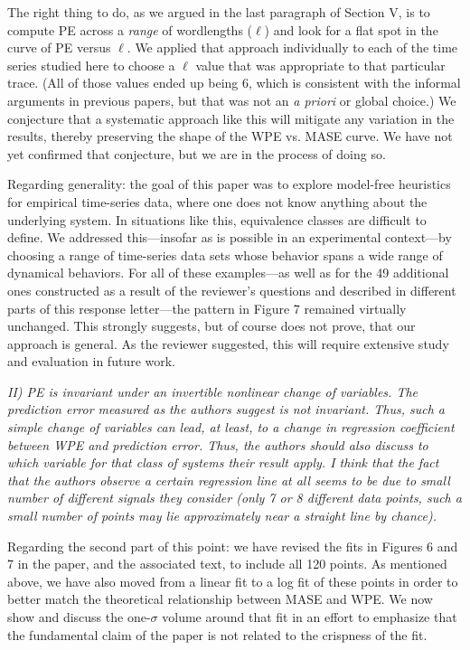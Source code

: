 \documentclass[12pt]{article}
\begin{document}
The right thing to do, as we argued in the last paragraph of Section
V, is to compute PE across a \emph{range} of wordlengths ($\ell$) and
look for a flat spot in the curve of PE versus $\ell$.  We applied
that approach individually to each of the time series studied here to
choose a $\ell$ value that was appropriate to that particular trace.
(All of those values ended up being 6, which is consistent with the
informal arguments in previous papers, but that was not an \emph{a
  priori} or global choice.)  We conjecture that a systematic approach
like this will mitigate any variation in the results, thereby
preserving the shape of the WPE vs. MASE curve.  We have not yet
confirmed that conjecture, but we are in the process of doing so.

Regarding generality: the goal of this paper was to explore model-free
heuristics for empirical time-series data, where one does not know
anything about the underlying system.  In situations like this,
equivalence classes are difficult to define.  We addressed
this---insofar as is possible in an experimental context---by choosing
a range of time-series data sets whose behavior spans a wide range of
dynamical behaviors.  For all of these examples---as well as for the
49 additional ones
constructed as a result of the reviewer's questions and described in
different parts of this response letter---the pattern in Figure 7
remained virtually unchanged.  This strongly suggests, but of course
does not prove, that our approach is general.  As the reviewer
suggested, this will require extensive study and evaluation in future
work.

\smallskip

\emph{II) PE is invariant under an invertible nonlinear change of
  variables. The prediction error measured as the authors suggest is
  not invariant. Thus, such a simple change of variables can lead, at
  least, to a change in regression coefficient between WPE and
  prediction error. Thus, the authors should also discuss to which
  variable for that class of systems their result apply. I think that
  the fact that the authors observe a certain regression line at all
  seems to be due to small number of different signals they consider
  (only 7 or 8 different data points, such a small number of points
  may lie approximately near a straight line by chance).}

Regarding the second part of this point: we have revised the fits in
Figures 6 and 7 in the paper, and the associated text, to include all
120 points.  As mentioned above, we have also moved from a linear fit
to a log fit of these points in order to better match the theoretical
relationship between MASE and WPE.  We now show and discuss the
one-$\sigma$ volume around that fit in an effort to emphasize that the
fundamental claim of the paper is not related to the crispness of the
fit.
\end{document}
